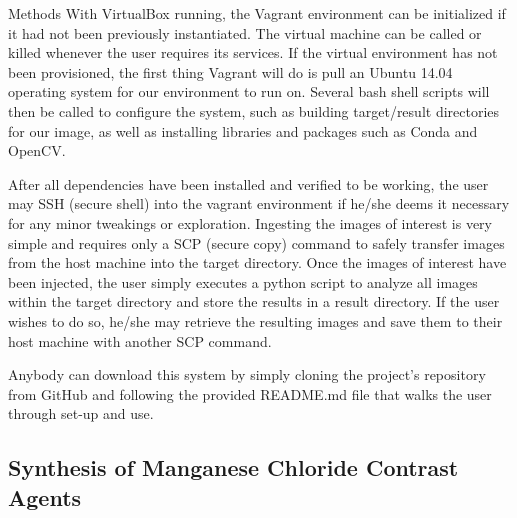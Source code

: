 \documentclass[a4paper,12pt]{article}
\begin{document}
\begin{section}{Methods}
With VirtualBox running, the Vagrant environment can be initialized if it had not been previously instantiated. The virtual machine can be called or killed whenever the user requires its services. If the virtual environment has not been provisioned, the first thing Vagrant will do is pull an Ubuntu 14.04 operating system for our environment to run on. Several bash shell scripts will then be called to configure the system, such as building target/result directories for our image, as well as installing libraries and packages such as Conda and OpenCV. 

After all dependencies have been installed and verified to be working, the user may SSH (secure shell) into the vagrant environment if he/she deems it necessary for any minor tweakings or exploration. Ingesting the images of interest is very simple and requires only a SCP (secure copy) command to safely transfer images from the host machine into the target directory. Once the images of interest have been injected, the user simply executes a python script to analyze all images within the target directory and store the results in a result directory. If the user wishes to do so, he/she may retrieve the resulting images and save them to their host machine with another SCP command.

Anybody can download this system by simply cloning the project's repository from GitHub and following the provided README.md file that walks the user through set-up and use.

\subsection{Synthesis of Manganese Chloride Contrast Agents}



\end{section}
\end{document}
